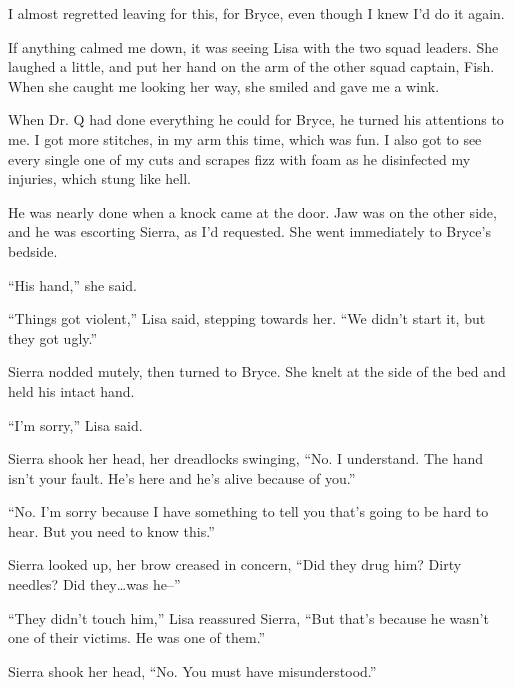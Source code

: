 I almost regretted leaving for this, for Bryce, even though I knew I'd do it again.



If anything calmed me down, it was seeing Lisa with the two squad leaders.  She laughed a little, and put her hand on the arm of the other squad captain, Fish.  When she caught me looking her way, she smiled and gave me a wink.



When Dr. Q had done everything he could for Bryce, he turned his attentions to me.  I got more stitches, in my arm this time, which was fun.  I also got to see every single one of my cuts and scrapes fizz with foam as he disinfected my injuries, which stung like hell.



He was nearly done when a knock came at the door.  Jaw was on the other side, and he was escorting Sierra, as I'd requested.  She went immediately to Bryce's bedside.



``His hand,'' she said.



``Things got violent,'' Lisa said, stepping towards her.  ``We didn't start it, but they got ugly.''



Sierra nodded mutely, then turned to Bryce.  She knelt at the side of the bed and held his intact hand.



``I'm sorry,'' Lisa said.



Sierra shook her head, her dreadlocks swinging, ``No.  I understand.  The hand isn't your fault.  He's here and he's alive because of you.''



``No.  I'm sorry because I have something to tell you that's going to be hard to hear.  But you need to know this.''



Sierra looked up, her brow creased in concern, ``Did they drug him?  Dirty needles?  Did they\ldots was he--''



``They didn't touch him,'' Lisa reassured Sierra, ``But that's because he wasn't one of their victims.  He was one of them.''



Sierra shook her head, ``No.  You must have misunderstood.''




